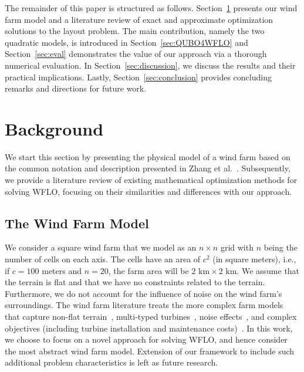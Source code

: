 \documentclass[preprint,12pt]{elsarticle}
\begin{document}
The remainder of this paper is structured as follows. Section~\ref{sec:related} presents our wind farm model and a literature review of exact and approximate
optimization solutions to the layout problem. The main contribution, namely the two quadratic models, is introduced in Section~\ref{sec:QUBO4WFLO} and Section~\ref{sec:eval} demonstrates the value of our approach via a thorough  numerical evaluation.
In Section~\ref{sec:discussion}, we discuss the results and their practical implications.
Lastly, Section~\ref{sec:conclusion} provides concluding remarks and directions for future work.   


\section{Background}
\label{sec:related}

We start this section by presenting the physical model of a wind farm
based on the common
notation and description presented in Zhang et al.\ \cite{Zhang2014}.  Subsequently,
we provide a literature review of existing mathematical optimization
methods for solving WFLO, focusing on their similarities and
differences with our approach.
 
\subsection{The Wind Farm Model}

We consider a square wind farm that we model as an $n\times n$
grid with $n$ being the number of cells on each axis.  The cells have
an area of $c^2$ (in square meters), i.e., if $c=100$ meters and
$n=20$, the farm area will be $2 \mbox{ km} \times 2 \mbox{ km}$.  We
assume that the terrain is flat and that we have no constraints
related to the terrain.  Furthermore, we do not account for the
influence of noise on the wind farm's surroundings. The wind farm
literature treats the more complex farm models that capture non-flat
terrain~\cite{song2015lazy,kuo2016wind}, multi-typed
turbines~\cite{feng2017design}, noise
effects~\cite{Zhang2014,sorkhabi2016impact,yin2014multi}, and complex
objectives (including turbine installation and maintenance
costs)~\cite{lackner2007analytical,sorkhabi2018constrained}.  In this work, we 
choose to focus on a
novel approach for solving WFLO, and hence consider the most
abstract wind farm model. Extension of our framework to include such additional problem characteristics is left as future research.
 
\end{document}
